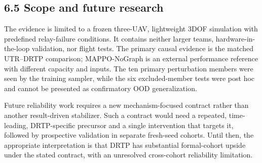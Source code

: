 \subsection{6.5 Scope and future research}

The evidence is limited to a frozen three-UAV, lightweight 3DOF simulation with predefined relay-failure conditions. It contains neither larger teams, hardware-in-the-loop validation, nor flight tests. The primary causal evidence is the matched UTR--DRTP comparison; MAPPO-NoGraph is an external performance reference with different capacity and inputs. The ten primary perturbation members were seen by the training sampler, while the six excluded-member tests were post hoc and cannot be presented as confirmatory OOD generalization.

Future reliability work requires a new mechanism-focused contract rather than another result-driven stabilizer. Such a contract would need a repeated, time-leading, DRTP-specific precursor and a single intervention that targets it, followed by prospective validation in separate fresh-seed cohorts. Until then, the appropriate interpretation is that DRTP has substantial formal-cohort upside under the stated contract, with an unresolved cross-cohort reliability limitation.